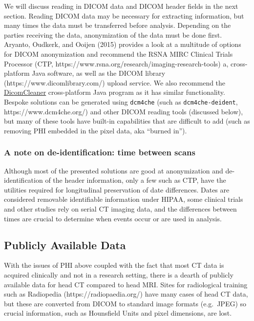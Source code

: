 \documentclass[]{elsarticle} %
\begin{document}
We will discuss reading in DICOM data and DICOM header fields in the next section. Reading DICOM data may be necessary for extracting information, but many times the data must be transferred before analysis. Depending on the parties receiving the data, anonymization of the data must be done first. Aryanto, Oudkerk, and Ooijen (2015) provides a look at a multitude of options for DICOM anonymization and recommend the RSNA MIRC Clinical Trials Processor (CTP, https://www.rsna.org/research/imaging-research-tools) a, cross-platform Java software, as well as the DICOM library (https://www.dicomlibrary.com/) upload service. We also recommend the \href{https://www.dclunie.com/pixelmed/software/webstart/DicomCleanerUsage.html}{DicomCleaner} cross-platform Java program as it has similar functionality. Bespoke solutions can be generated using \texttt{dcm4che} (such as \texttt{dcm4che-deident}, https://www.dcm4che.org/) and other DICOM reading tools (discussed below), but many of these tools have built-in capabilities that are difficult to add (such as removing PHI embedded in the pixel data, aka ``burned in'').

\hypertarget{a-note-on-de-identification-time-between-scans}{%
\subsubsection{A note on de-identification: time between scans}\label{a-note-on-de-identification-time-between-scans}}

Although most of the presented solutions are good at anonymization and de-identification of the header information, only a few such as CTP, have the utilities required for longitudinal preservation of date differences. Dates are considered removable identifiable information under HIPAA, some clinical trials and other studies rely on serial CT imaging data, and the differences between times are crucial to determine when events occur or are used in analysis.

\hypertarget{publicly-available-data}{%
\subsection{Publicly Available Data}\label{publicly-available-data}}

With the issues of PHI above coupled with the fact that most CT data is acquired clinically and not in a research setting, there is a dearth of publicly available data for head CT compared to head MRI. Sites for radiological training such as Radiopedia (https://radiopaedia.org/) have many cases of head CT data, but these are converted from DICOM to standard image formats (e.g.~JPEG) so crucial information, such as Hounsfield Units and pixel dimensions, are lost.
\end{document}
